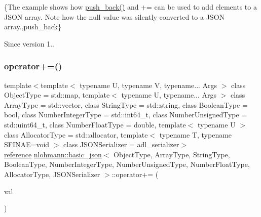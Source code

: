 \{The example shows how {\ttfamily \mbox{\hyperlink{classnlohmann_1_1basic__json_ac8e523ddc8c2dd7e5d2daf0d49a9c0d7}{push\+\_\+back()}}} and {\ttfamily +=} can be used to add elements to a J\+S\+ON array. Note how the {\ttfamily null} value was silently converted to a J\+S\+ON array.,push\+\_\+back\}

\begin{DoxySince}{Since}
version 1.. 
\end{DoxySince}
\mbox{\label{classnlohmann_1_1basic__json_adc29dd6358ff7a9062d7e168c24e7484}} 
\subsubsection{\texorpdfstring{operator+=()}{operator+=()}\hspace{0.1cm}{\footnotesize\ttfamily [2/4]}}
{\footnotesize\ttfamily template$<$template$<$ typename U, typename V, typename... Args $>$ class Object\+Type = std\+::map, template$<$ typename U, typename... Args $>$ class Array\+Type = std\+::vector, class String\+Type  = std\+::string, class Boolean\+Type  = bool, class Number\+Integer\+Type  = std\+::int64\+\_\+t, class Number\+Unsigned\+Type  = std\+::uint64\+\_\+t, class Number\+Float\+Type  = double, template$<$ typename U $>$ class Allocator\+Type = std\+::allocator, template$<$ typename T, typename S\+F\+I\+N\+A\+E=void $>$ class J\+S\+O\+N\+Serializer = adl\+\_\+serializer$>$ \\
\mbox{\hyperlink{classnlohmann_1_1basic__json_ac6a5eddd156c776ac75ff54cfe54a5bc}{reference}} \mbox{\hyperlink{classnlohmann_1_1basic__json}{nlohmann\+::basic\+\_\+json}}$<$ Object\+Type, Array\+Type, String\+Type, Boolean\+Type, Number\+Integer\+Type, Number\+Unsigned\+Type, Number\+Float\+Type, Allocator\+Type, J\+S\+O\+N\+Serializer $>$\+::operator+= (\begin{DoxyParamCaption}\item[{const \mbox{\hyperlink{classnlohmann_1_1basic__json}{basic\+\_\+json}}$<$ Object\+Type, Array\+Type, String\+Type, Boolean\+Type, Number\+Integer\+Type, Number\+Unsigned\+Type, Number\+Float\+Type, Allocator\+Type, J\+S\+O\+N\+Serializer $>$ \&}]{val }\end{DoxyParamCaption})\hspace{0.3cm}{\ttfamily [inline]}}



